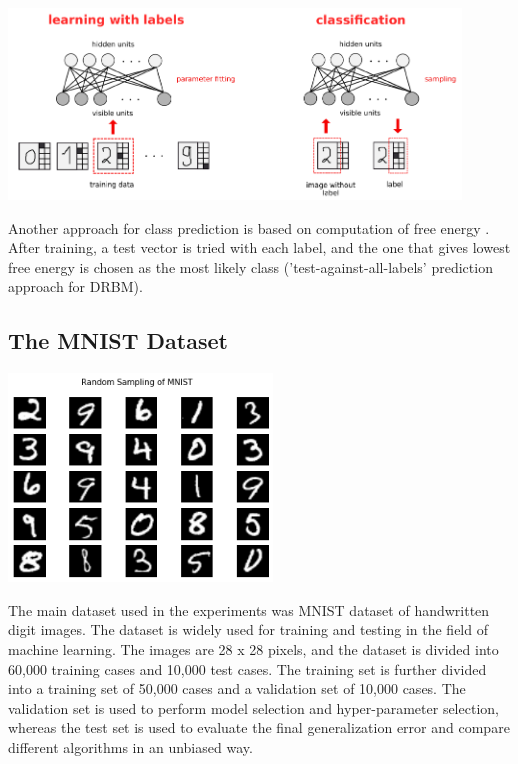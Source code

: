 \documentclass[a4paper]{scrartcl}
\begin{document}
\begin{center}
\includegraphics[width=12cm]{images/DRBM.png}
\end{center}
Another approach for class prediction is based on computation of free energy \cite{Hinton}. After training, a test vector is tried with each label, and the one that gives lowest free energy is chosen as the most likely class ('test-against-all-labels' prediction approach for DRBM).

\subsection{The MNIST Dataset}
\begin{minipage}[t]{0.5\textwidth}
\includegraphics[width=7cm]{images/mnist-example.png}
\end{minipage}
\par The main dataset used in the experiments was MNIST dataset of handwritten digit images. The dataset is widely used for training and testing in the field of machine learning. The images are 28 x 28 pixels, and the dataset is divided into 60,000 training cases and 10,000 test cases. The training set is further divided into a training set of 50,000 cases and a validation set of 10,000 cases. The validation set is used to perform model selection and hyper-parameter selection, whereas the test set is used to evaluate the final generalization error and compare different algorithms in an unbiased way.
\end{document}
